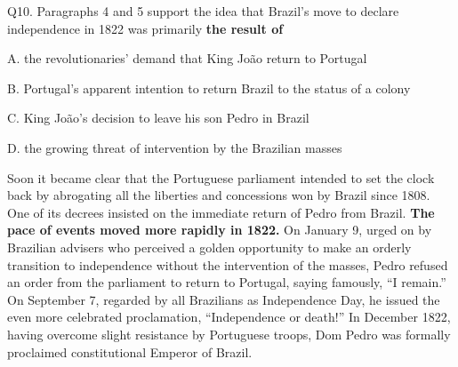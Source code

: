 \begin{blk}
    \begin{qst}
        Q10. Paragraphs 4 and 5 support the idea that Brazil’s move to declare independence in 1822 was primarily \textbf{the result of}
    \end{qst}

    \begin{chc}
        A. the revolutionaries’ demand that King João return to Portugal

        B. Portugal’s apparent intention to return Brazil to the status of a colony

        C. King João’s decision to leave his son Pedro in Brazil

        D. the growing threat of intervention by the Brazilian masses
    \end{chc}

    \begin{psgq}
        Soon it became clear that the Portuguese parliament intended to set the clock back by abrogating all the liberties and concessions won by Brazil since 1808. One of its decrees insisted on the immediate return of Pedro from Brazil. \textbf{The pace of events moved more rapidly in 1822.} On January 9, urged on by Brazilian advisers who perceived a golden opportunity to make an orderly transition to independence without the intervention of the masses, Pedro refused an order from the parliament to return to Portugal, saying famously, “I remain.” On September 7, regarded by all Brazilians as Independence Day, he issued the even more celebrated proclamation, “Independence or death!” In December 1822, having overcome slight resistance by Portuguese troops, Dom Pedro was formally proclaimed constitutional Emperor of Brazil.
    \end{psgq}


\end{blk}
